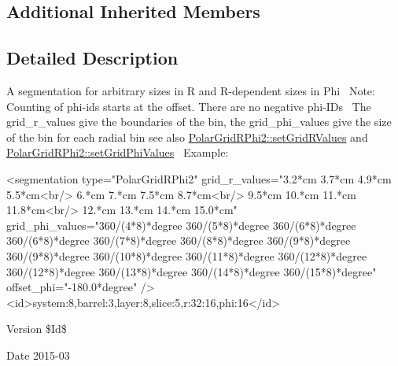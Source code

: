 \subsection*{Additional Inherited Members}


\subsection{Detailed Description}
A segmentation for arbitrary sizes in R and R-\/dependent sizes in Phi~\newline
 Note\+: Counting of phi-\/ids starts at the offset. There are no negative phi-\/\+I\+Ds~\newline
 The grid\+\_\+r\+\_\+values give the boundaries of the bin, the grid\+\_\+phi\+\_\+values give the size of the bin for each radial bin see also \hyperlink{class_d_d4hep_1_1_d_d_segmentation_1_1_polar_grid_r_phi2_a2194e846c26953f06cc74481d8aadeb4}{Polar\+Grid\+R\+Phi2\+::set\+Grid\+R\+Values} and \hyperlink{class_d_d4hep_1_1_d_d_segmentation_1_1_polar_grid_r_phi2_a738e77165e575ee463fab4e5daec543b}{Polar\+Grid\+R\+Phi2\+::set\+Grid\+Phi\+Values}~\newline
 Example\+:~\newline
 \begin{DoxyVerb} <segmentation type="PolarGridRPhi2"
               grid_r_values="3.2*cm 3.7*cm 4.9*cm 5.5*cm<br/>
                              6.*cm 7.*cm 7.5*cm 8.7*cm<br/>
                              9.5*cm 10.*cm 11.*cm 11.8*cm<br/>
                              12.*cm 13.*cm 14.*cm 15.0*cm"
               grid_phi_values="360/(4*8)*degree 360/(5*8)*degree
                                360/(6*8)*degree 360/(6*8)*degree
                                360/(7*8)*degree 360/(8*8)*degree
                                360/(9*8)*degree 360/(9*8)*degree
                                360/(10*8)*degree 360/(11*8)*degree
                                360/(12*8)*degree 360/(12*8)*degree
                                360/(13*8)*degree 360/(14*8)*degree
                                360/(15*8)*degree"
               offset_phi="-180.0*degree"
                  />
 <id>system:8,barrel:3,layer:8,slice:5,r:32:16,phi:16</id>
\end{DoxyVerb}
 \begin{DoxyVersion}{Version}
\$\+Id\$ 
\end{DoxyVersion}
\begin{DoxyDate}{Date}
2015-\/03 
\end{DoxyDate}


